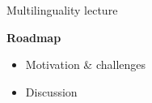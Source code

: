 \begin{vbframe}{Multilinguality lecture}

\vfill

\textbf{Roadmap}

	\begin{itemize}
		\item Motivation \& challenges
		\item Discussion

	\end{itemize}

\vfill

\end{vbframe}

